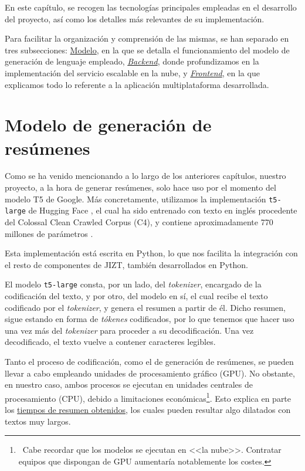  \label{chapter:tecnicas}

En este capítulo, se recogen las tecnologías principales empleadas en el desarrollo del proyecto, así como los detalles más relevantes de su implementación.

Para facilitar la organización y comprensión de las mismas, se han separado en tres subsecciones: \hyperref[sec:model]{Modelo}, en la que se detalla el funcionamiento del modelo de generación de lenguaje empleado, \hyperref[sec:backend]{\emph{Backend}}, donde profundizamos en la implementación del servicio escalable en la nube, y \hyperref[sec:frontend]{\emph{Frontend}}, en la que explicamos todo lo referente a la aplicación multiplataforma desarrollada.


\section{Modelo de generación de resúmenes} \label{sec:model}

Como se ha venido mencionando a lo largo de los anteriores capítulos, nuestro proyecto, a la hora de generar resúmenes, solo hace uso por el momento del modelo T5 de Google. Más concretamente, utilizamos la implementación \texttt{t5-large} de Hugging Face \cite{t5-hf}, el cual ha sido entrenado con texto en inglés procedente del Colossal Clean Crawled Corpus (C4), y contiene aproximadamente 770 millones de parámetros \cite{hf-pretrained}.

Esta implementación está escrita en Python, lo que nos facilita la integración con el resto de componentes de JIZT, también desarrollados en Python.

El modelo \texttt{t5-large} consta, por un lado, del \emph{tokenizer}, encargado de la codificación del texto, y por otro, del modelo en sí, el cual recibe el texto codificado por el \emph{tokenizer}, y genera el resumen a partir de él. Dicho resumen, sigue estando en forma de \emph{tókenes} codificados, por lo que tenemos que hacer uso una vez más del \emph{tokenizer} para proceder a su decodificación. Una vez decodificado, el texto vuelve a contener caracteres legibles.

Tanto el proceso de codificación, como el de generación de resúmenes, se pueden llevar a cabo empleando unidades de procesamiento gráfico (GPU). No obstante, en nuestro caso, ambos procesos se ejecutan en unidades centrales de procesamiento (CPU), debido a limitaciones económicas\footnote{\, Cabe recordar que los modelos se ejecutan en <<la nube>>. Contratar equipos que dispongan de GPU aumentaría notablemente los costes.}. Esto explica en parte los \hyperref[table:comparativa]{tiempos de resumen obtenidos}, los cuales pueden resultar algo dilatados con textos muy largos.

